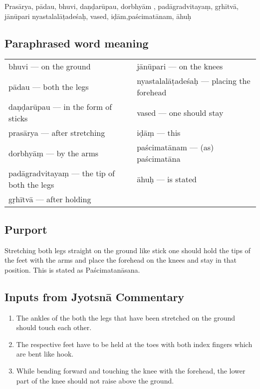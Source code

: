 Prasārya, pādau, bhuvi, daṇḍarūpau, dorbhyām , padāgradvitayaṃ, gṛhītvā, jānūpari nyastalalāṭadeśaḥ,  vased, iḍām,paścimatānam, āhuḥ

\subsection*{Paraphrased word meaning}
\vspace{-10pt}

\begin{longtable}{>{\noindent\raggedright}p{5cm}>{\noindent\raggedright}p{5cm}}
bhuvi --- on the ground & jānūpari --- on the knees\tabularnewline
pādau --- both the legs  & nyastalalāṭadeśaḥ --- placing the forehead\tabularnewline
daṇḍarūpau --- in the form of sticks  & vased --- one should stay\tabularnewline
prasārya --- after stretching  & iḍāṃ --- this\tabularnewline
dorbhyāṃ --- by the arms  & paścimatānam --- (as) paścimatāna\tabularnewline
padāgradvitayaṃ --- the tip of both the legs  & āhuḥ --- is stated \tabularnewline
gṛhītvā --- after holding & 
\end{longtable}
\vspace{-10pt}

\subsection*{Purport}
\vspace{-10pt}

Stretching both legs straight on the ground like stick one should hold the tips of the feet with the arms and place the forehead on the knees and stay in that position. This is stated as Paścimatanāsana.
\vspace{-10pt}

\subsection*{Inputs from Jyotsnā Commentary}
\vspace{-10pt}

\begin{enumerate}
\itemsep=0pt
\item The ankles of the both the legs that have been stretched on the ground should touch each other. 
\item The respective feet have to be held at the toes with both index fingers which are bent like hook.  
\item While bending forward and touching the knee with the forehead, the lower part of the knee should not raise above the ground.
\end{enumerate}
\vspace{-10pt}


